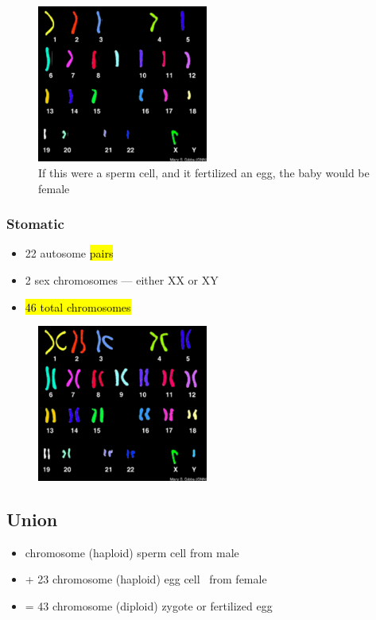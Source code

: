 \documentclass[a4paper,12pt]{article}
\begin{document}
\begin{figure}[H]
    \centering
    \includegraphics[width=0.50\textwidth]{23}
    \caption{If this were a sperm cell, and it fertilized an egg, the baby would be female}
\end{figure}

\subsubsection{Stomatic}
\begin{itemize}
    \item{22 autosome \hl{pairs}}
    \item{2 sex chromosomes --- either \female XX or \male XY}
    \item{\hl{46 total chromosomes}}
\end{itemize}

\begin{figure}[H]
    \centering
    \includegraphics[width=0.50\textwidth]{46}
\end{figure}

\subsection{Union}
\begin{itemize}
    \item{\;\;\; chromosome (haploid) sperm cell from \male\! male}
    \item{+ 23 chromosome (haploid) egg cell \;\;\,\,\,from \female\! female}
    \item{= 43 chromosome (diploid) zygote or fertilized egg}
\end{itemize}
\end{document}
